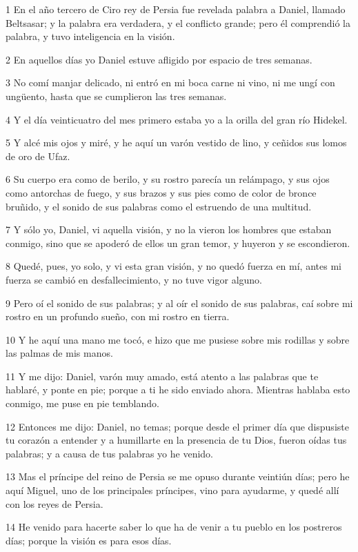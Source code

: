 \par 1 En el año tercero de Ciro rey de Persia fue revelada palabra a Daniel, llamado Beltsasar; y la palabra era verdadera, y el conflicto grande; pero él comprendió la palabra, y tuvo inteligencia en la visión.
\par 2 En aquellos días yo Daniel estuve afligido por espacio de tres semanas.
\par 3 No comí manjar delicado, ni entró en mi boca carne ni vino, ni me ungí con ungüento, hasta que se cumplieron las tres semanas.
\par 4 Y el día veinticuatro del mes primero estaba yo a la orilla del gran río Hidekel.
\par 5 Y alcé mis ojos y miré, y he aquí un varón vestido de lino, y ceñidos sus lomos de oro de Ufaz.
\par 6 Su cuerpo era como de berilo, y su rostro parecía un relámpago, y sus ojos como antorchas de fuego, y sus brazos y sus pies como de color de bronce bruñido, y el sonido de sus palabras como el estruendo de una multitud.
\par 7 Y sólo yo, Daniel, vi aquella visión, y no la vieron los hombres que estaban conmigo, sino que se apoderó de ellos un gran temor, y huyeron y se escondieron.
\par 8 Quedé, pues, yo solo, y vi esta gran visión, y no quedó fuerza en mí, antes mi fuerza se cambió en desfallecimiento, y no tuve vigor alguno.
\par 9 Pero oí el sonido de sus palabras; y al oír el sonido de sus palabras, caí sobre mi rostro en un profundo sueño, con mi rostro en tierra.
\par 10 Y he aquí una mano me tocó, e hizo que me pusiese sobre mis rodillas y sobre las palmas de mis manos.
\par 11 Y me dijo: Daniel, varón muy amado, está atento a las palabras que te hablaré, y ponte en pie; porque a ti he sido enviado ahora. Mientras hablaba esto conmigo, me puse en pie temblando.
\par 12 Entonces me dijo: Daniel, no temas; porque desde el primer día que dispusiste tu corazón a entender y a humillarte en la presencia de tu Dios, fueron oídas tus palabras; y a causa de tus palabras yo he venido.
\par 13 Mas el príncipe del reino de Persia se me opuso durante veintiún días; pero he aquí Miguel, uno de los principales príncipes, vino para ayudarme, y quedé allí con los reyes de Persia.
\par 14 He venido para hacerte saber lo que ha de venir a tu pueblo en los postreros días; porque la visión es para esos días.
